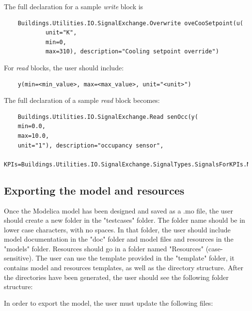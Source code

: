\documentclass{article}
\begin{document}
The full declaration for a sample \textit{write} block is
\begin{verbatim}
    Buildings.Utilities.IO.SignalExchange.Overwrite oveCooSetpoint(u(
            unit="K",
            min=0,
            max=310), description="Cooling setpoint override")
\end{verbatim}

For \textit{read} blocks, the user should include:

\begin{verbatim}
    y(min=<min_value>, max=<max_value>, unit="<unit>")
\end{verbatim}

The full declaration of a sample \textit{read} block becomes:

\begin{verbatim}
    Buildings.Utilities.IO.SignalExchange.Read senOcc(y(
    min=0.0, 
    max=10.0, 
    unit="1"), description="occupancy sensor",
    KPIs=Buildings.Utilities.IO.SignalExchange.SignalTypes.SignalsForKPIs.None)
\end{verbatim}

\subsection{Exporting the model and resources}\label{s:dev-fmu}

Once the Modelica model has been designed and saved as a .mo file, the user should create a new folder in the "testcases" folder. The folder name should be in lower case characters, with no spaces. In that folder, the user should include model documentation in the "doc" folder and model files and resources in the "models" folder. Resources should go in a folder named "Resources" (case-sensitive). The user can use the template provided in the "template" folder, it contains model and resources templates, as well as the directory structure.
After the directories have been generated, the user should see the following folder structure:

In order to export the model, the user must update the following files:
\end{document}

